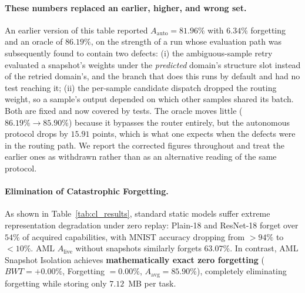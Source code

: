 \documentclass[11pt, a4paper]{article}
\begin{document}
\paragraph{These numbers replaced an earlier, higher, and wrong set.} An earlier version of this table reported $A_{\text{auto}} = 81.96\%$ with $6.34\%$ forgetting and an oracle of $86.19\%$, on the strength of a run whose evaluation path was subsequently found to contain two defects: (i) the ambiguous-sample retry evaluated a snapshot's weights under the \emph{predicted} domain's structure slot instead of the retried domain's, and the branch that does this runs by default and had no test reaching it; (ii) the per-sample candidate dispatch dropped the routing weight, so a sample's output depended on which other samples shared its batch. Both are fixed and now covered by tests. The oracle moves little ($86.19\% \to 85.90\%$) because it bypasses the router entirely, but the autonomous protocol drops by $15.91$ points, which is what one expects when the defects were in the routing path. We report the corrected figures throughout and treat the earlier ones as withdrawn rather than as an alternative reading of the same protocol.

\paragraph{Elimination of Catastrophic Forgetting.}
As shown in Table~\ref{tab:cl_results}, standard static models suffer extreme representation degradation under zero replay: Plain-18 and ResNet-18 forget over $54\%$ of acquired capabilities, with MNIST accuracy dropping from $>94\%$ to $<10\%$. AML $A_{\text{live}}$ without snapshots similarly forgets $63.07\%$. In contrast, AML Snapshot Isolation achieves \textbf{mathematically exact zero forgetting} ($BWT = +0.00\%$, Forgetting $= 0.00\%$, $A_{\text{avg}} = 85.90\%$), completely eliminating forgetting while storing only $7.12$~MB per task.
\end{document}
